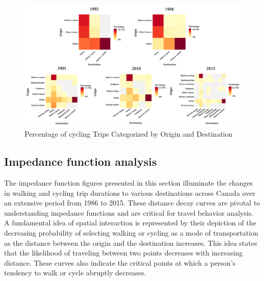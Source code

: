 \documentclass[
11pt, %
oneside, %
english, %
singlespacing, %
]{macthesis} %
\begin{document}
\clearpage
\newpage
\thispagestyle{empty}
\begin{landscape}

\begin{figure}

{\centering \includegraphics[width=1\linewidth]{figure/ch03-Fig02} 

}

\caption{Percentage of cycling Trips Categorized by Origin and Destination}\label{fig:heat-c}
\end{figure}
\end{landscape}
\clearpage

\hypertarget{impedance-function-analysis}{%
\subsection{Impedance function analysis}\label{impedance-function-analysis}}

The impedance function figures presented in this section illuminate the changes in walking and cycling trip durations to various destinations across Canada over an extensive period from 1986 to 2015. These distance decay curves are pivotal to understanding impedance functions and are critical for travel behavior analysis. A fundamental idea of spatial interaction is represented by their depiction of the decreasing probability of selecting walking or cycling as a mode of transportation as the distance between the origin and the destination increases. This idea states that the likelihood of traveling between two points decreases with increasing distance. These curves also indicate the critical points at which a person's tendency to walk or cycle abruptly decreases.
\end{document}
